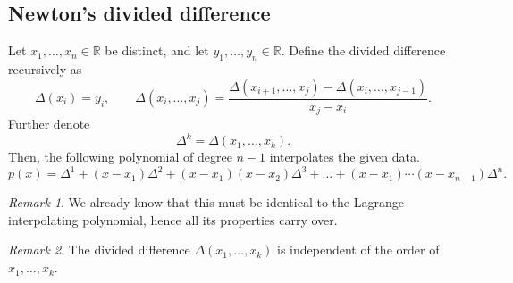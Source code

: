 \documentclass[11pt]{article}
\newcommand{\R}{\mathbb{R}}
\theoremstyle{definition}
\theoremstyle{remark}
\newtheorem*{remark}{Remark}
\numberwithin{equation}{section}
\begin{document}
    \subsection{Newton's divided difference}
    \begin{theorem}
        Let $x_1, \dots, x_n \in \R$ be distinct, and let $y_1, \dots, y_n \in \R$.
        Define the divided difference recursively as \[
            \Delta(x_i) = y_i, \qquad
            \Delta(x_i, \dots, x_j) = \frac{\Delta(x_{i + 1}, \dots, x_j) -
            \Delta(x_i, \dots, x_{j - 1})}{x_j - x_i}.
        \] Further denote \[
            \Delta^k = \Delta(x_1, \dots, x_k).
        \] Then, the following polynomial of degree $n - 1$ interpolates the given
        data. \[
            p(x) = \Delta^1 + (x - x_1)\Delta^2 + (x - x_1)(x - x_2)\Delta^3 + \dots
            + (x - x_1)\cdots(x - x_{n - 1})\Delta^n.
        \]

        \begin{remark}
            We already know that this must be identical to the Lagrange interpolating
            polynomial, hence all its properties carry over.
        \end{remark}
        \begin{remark}
            The divided difference $\Delta(x_1, \dots, x_k)$ is independent of the
            order of $x_1, \dots, x_k$.
        \end{remark}
    \end{theorem}
\end{document}
